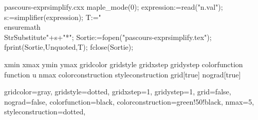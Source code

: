 \newenvironment*{fracsimplify}
{\VerbatimEnvironment\begin{VerbatimOut}{n.val}}
{\end{VerbatimOut}
\immediate\write18{giac <pascours-fracsimplify.cxx}

}


\begin{VerbatimOut}{pascours-exprsimplify.cxx}
maple_mode(0);
expression:=read("n.val");
s:=simplifier(expression);
T:="\\ensuremath{\\StrSubstitute{"+s+"}{*}{}}";
Sortie:=fopen("pascours-exprsimplify.tex");
fprint(Sortie,Unquoted,T);
fclose(Sortie);
\end{VerbatimOut}
  
\newenvironment*{exprsimplify}
{\VerbatimEnvironment\begin{VerbatimOut}{n.val}}
{\end{VerbatimOut}
\immediate\write18{giac <pascours-exprsimplify.cxx}

}


 {xmin}{}
 {xmax}{}
 {ymin}{}
 {ymax}{}
 {gridcolor}{}
 {gridstyle}{}
 {gridxstep}{}
 {gridystep}{}
 {colorfunction}{}
 {function}{}
 {u}{}
 {nmax}{}
 {colorconstruction}{}
 {styleconstruction}{}
 {grid}[true]{} 
 {nograd}[true]{} 

 {%
									gridcolor=gray,%
									gridstyle=dotted,%
									gridxstep=1,%
									gridystep=1,%
									grid=false,%
									nograd=false,%
									colorfunction=black,%
									colorconstruction=green!50!black,%
									nmax=5,%
									styleconstruction=dotted,%
									}{}

